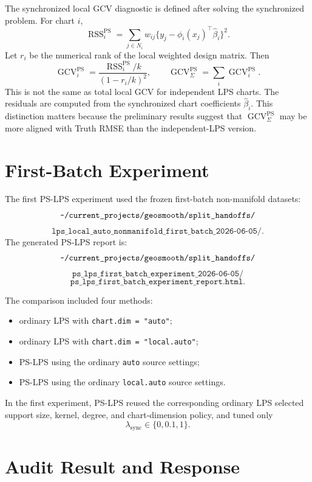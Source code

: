 \documentclass[11pt]{article}
\newcommand{\GCV}{\operatorname{GCV}}
\begin{document}
The synchronized local GCV diagnostic is defined after solving the synchronized
problem.  For chart \(i\),
\[
  \operatorname{RSS}^{\mathrm{PS}}_i
  =
  \sum_{j\in N_i}
  w_{ij}
  \{y_j-\phi_i(x_j)^\top\widehat\beta_i\}^2.
\]
Let \(r_i\) be the numerical rank of the local weighted design matrix.  Then
\[
  \GCV^{\mathrm{PS}}_i
  =
  \frac{\operatorname{RSS}^{\mathrm{PS}}_i/k}
       {(1-r_i/k)^2},
  \qquad
  \GCV^{\mathrm{PS}}_{\Sigma}
  =
  \sum_i \GCV^{\mathrm{PS}}_i.
\]
This is not the same as total local GCV for independent LPS charts.  The
residuals are computed from the synchronized chart coefficients
\(\widehat\beta_i\).  This distinction matters because the preliminary results
suggest that \(\GCV^{\mathrm{PS}}_{\Sigma}\) may be more aligned with Truth RMSE
than the independent-LPS version.

\section{First-Batch Experiment}

The first PS-LPS experiment used the frozen first-batch non-manifold datasets:
\[
  \texttt{\string~/current\_projects/geosmooth/split\_handoffs/}
\]
\[
  \texttt{lps\_local\_auto\_nonmanifold\_first\_batch\_2026-06-05/}.
\]
The generated PS-LPS report is:
\[
  \texttt{\string~/current\_projects/geosmooth/split\_handoffs/}
\]
\[
  \texttt{ps\_lps\_first\_batch\_experiment\_2026-06-05/}
\]
\[
  \texttt{ps\_lps\_first\_batch\_experiment\_report.html}.
\]

The comparison included four methods:
\begin{itemize}[leftmargin=*]
  \item ordinary LPS with \texttt{chart.dim = "auto"};
  \item ordinary LPS with \texttt{chart.dim = "local.auto"};
  \item PS-LPS using the ordinary \texttt{auto} source settings;
  \item PS-LPS using the ordinary \texttt{local.auto} source settings.
\end{itemize}
In the first experiment, PS-LPS reused the corresponding ordinary LPS selected
support size, kernel, degree, and chart-dimension policy, and tuned only
\[
  \lambda_{\mathrm{sync}}\in\{0,0.1,1\}.
\]

\section{Audit Result and Response}
\end{document}
